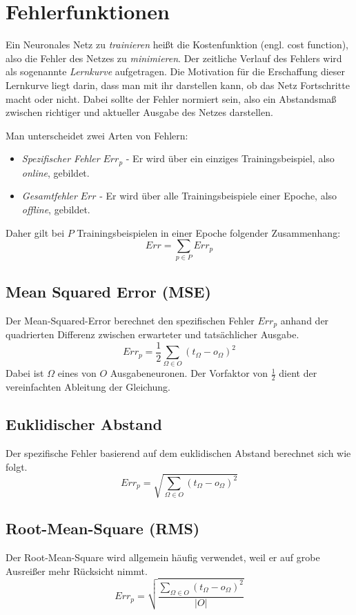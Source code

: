 \section*{Fehlerfunktionen}
Ein Neuronales Netz zu \emph{trainieren} heißt die Kostenfunktion (engl. cost function), also die Fehler des Netzes zu \emph{minimieren}.
Der zeitliche Verlauf des Fehlers wird als sogenannte \emph{Lernkurve} aufgetragen. Die Motivation für die Erschaffung dieser Lernkurve liegt darin, dass man mit ihr darstellen kann, ob das Netz Fortschritte macht oder nicht. Dabei sollte der Fehler normiert sein, also ein Abstandsmaß zwischen richtiger und aktueller Ausgabe des Netzes darstellen.

Man unterscheidet zwei Arten von Fehlern:
\begin{itemize}
	\item \emph{Spezifischer Fehler} $Err_p$ - Er wird über ein einziges Trainingsbeispiel, also \emph{online}, gebildet.
	\item \emph{Gesamtfehler} $Err$ - Er wird über alle Trainingsbeispiele einer Epoche, also \emph{offline}, gebildet.
\end{itemize}
Daher gilt bei $P$ Trainingsbeispielen in einer Epoche folgender Zusammenhang:
\[
	Err = \sum_{p \in P} Err_p
\]

\subsection*{Mean Squared Error (MSE)}
Der Mean-Squared-Error berechnet den spezifischen Fehler $Err_p$ anhand der quadrierten Differenz zwischen erwarteter und tatsächlicher Ausgabe.
\[
	Err_p = \frac{1}{2} \sum_{\Omega \in O} ( t_{\Omega} - o_{\Omega})^2
\]
Dabei ist $\Omega$ eines von $O$ Ausgabeneuronen. Der Vorfaktor von $\frac{1}{2}$ dient der vereinfachten Ableitung der Gleichung.

\subsection*{Euklidischer Abstand}
Der spezifische Fehler basierend auf dem euklidischen Abstand berechnet sich wie folgt.
\[
	Err_p = \sqrt{ \sum_{\Omega \in O} ( t_{\Omega} - o_{\Omega})^2 }
\]

\subsection*{Root-Mean-Square (RMS)}
Der Root-Mean-Square wird allgemein häufig verwendet, weil er auf grobe Ausreißer mehr Rücksicht nimmt.
\[
	Err_p = \sqrt{ \frac{
		\sum_{\Omega \in O} ( t_{\Omega} - o_{\Omega})^2 }
		{|O|}
		}
\]

